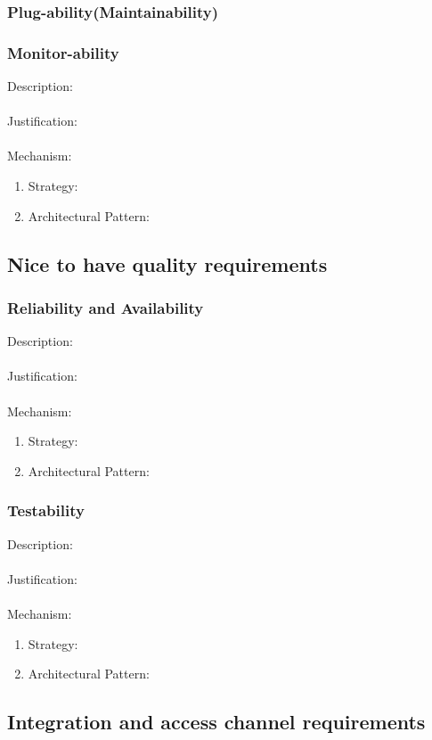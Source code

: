 \documentclass[a4paper,12pt,titlepage]{article}
\begin{document}
\subsubsection{Plug-ability(Maintainability)}%
	
	\newpage
\subsubsection{Monitor-ability}%
	Description: \\\\
	Justification: \\\\
	Mechanism:
	\begin{enumerate}
		\item Strategy: 
		\item Architectural Pattern:
	\end{enumerate}
\newpage
\subsection{Nice to have quality requirements}
\subsubsection{Reliability and Availability}%
	Description: \\\\
	Justification: \\\\
	Mechanism:
	\begin{enumerate}
		\item Strategy: 
		\item Architectural Pattern:
	\end{enumerate}
\subsubsection{Testability}%
	Description: \\\\
	Justification: \\\\
	Mechanism:
	\begin{enumerate}
		\item Strategy: 
		\item Architectural Pattern:
	\end{enumerate}
\newpage
\subsection{Integration and access channel requirements}
\newpage
\end{document}
